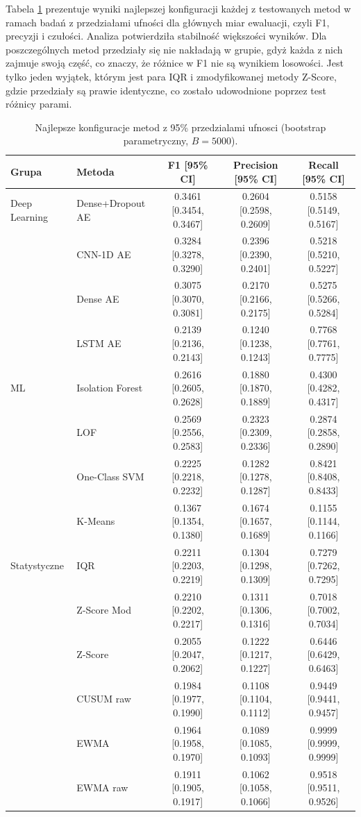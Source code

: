 \documentclass[a4paper,twoside,12pt]{book}
\begin{document}
Tabela \ref{tab:bootstrap_ci} prezentuje wyniki najlepszej konfiguracji każdej z testowanych metod w ramach badań z przedziałami ufności dla głównych miar ewaluacji, czyli F1, precyzji i czułości. 
Analiza potwierdziła stabilność większości wyników. Dla poszczególnych metod przedziały się nie nakładają w grupie, gdyż każda z nich zajmuje swoją część, co znaczy, że różnice w F1 nie są wynikiem losowości. Jest tylko jeden wyjątek, którym jest para IQR i zmodyfikowanej metody Z-Score, gdzie przedziały są prawie identyczne, co zostało udowodnione poprzez test różnicy parami.

\begin{table}[ht]
	\centering
	\caption{Najlepsze konfiguracje metod z 95\% przedzialami ufnosci (bootstrap parametryczny, $B=5000$).}
	\label{tab:bootstrap_ci}
	\small
	\begin{tabular}{llccc}
		\toprule
		Grupa & Metoda & F1 [95\% CI] & Precision [95\% CI] & Recall [95\% CI] \\
		\midrule
		Deep Learning & Dense+Dropout AE & 0.3461 [0.3454, 0.3467] & 0.2604 [0.2598, 0.2609] & 0.5158 [0.5149, 0.5167] \\
		& CNN-1D AE & 0.3284 [0.3278, 0.3290] & 0.2396 [0.2390, 0.2401] & 0.5218 [0.5210, 0.5227] \\
		& Dense AE & 0.3075 [0.3070, 0.3081] & 0.2170 [0.2166, 0.2175] & 0.5275 [0.5266, 0.5284] \\
		& LSTM AE & 0.2139 [0.2136, 0.2143] & 0.1240 [0.1238, 0.1243] & 0.7768 [0.7761, 0.7775] \\
		\midrule
		ML & Isolation Forest & 0.2616 [0.2605, 0.2628] & 0.1880 [0.1870, 0.1889] & 0.4300 [0.4282, 0.4317] \\
		& LOF & 0.2569 [0.2556, 0.2583] & 0.2323 [0.2309, 0.2336] & 0.2874 [0.2858, 0.2890] \\
		& One-Class SVM & 0.2225 [0.2218, 0.2232] & 0.1282 [0.1278, 0.1287] & 0.8421 [0.8408, 0.8433] \\
		& K-Means & 0.1367 [0.1354, 0.1380] & 0.1674 [0.1657, 0.1689] & 0.1155 [0.1144, 0.1166] \\
		\midrule
		Statystyczne & IQR & 0.2211 [0.2203, 0.2219] & 0.1304 [0.1298, 0.1309] & 0.7279 [0.7262, 0.7295] \\
		& Z-Score Mod & 0.2210 [0.2202, 0.2217] & 0.1311 [0.1306, 0.1316] & 0.7018 [0.7002, 0.7034] \\
		& Z-Score & 0.2055 [0.2047, 0.2062] & 0.1222 [0.1217, 0.1227] & 0.6446 [0.6429, 0.6463] \\
		& CUSUM raw & 0.1984 [0.1977, 0.1990] & 0.1108 [0.1104, 0.1112] & 0.9449 [0.9441, 0.9457] \\
		& EWMA & 0.1964 [0.1958, 0.1970] & 0.1089 [0.1085, 0.1093] & 0.9999 [0.9999, 0.9999] \\
		& EWMA raw & 0.1911 [0.1905, 0.1917] & 0.1062 [0.1058, 0.1066] & 0.9518 [0.9511, 0.9526] \\
		\bottomrule
	\end{tabular}
\end{table}
\end{document}
